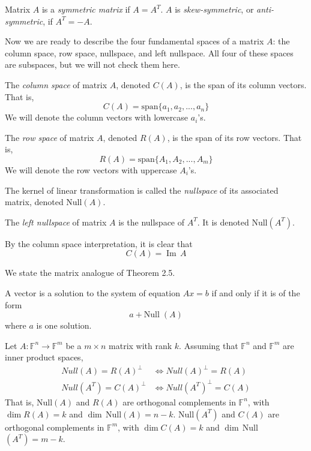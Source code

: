 \documentclass{article}
\DeclareMathOperator{\im}{Im}
\begin{document}
    \begin{definition}
    Matrix $A$ is a \textit{symmetric matrix} if $A = A^T$. $A$ is \textit{skew-symmetric}, or \textit{anti-symmetric}, if $A^T = - A$. 
    \end{definition}

    Now we are ready to describe the four fundamental spaces of a matrix $A$: the column space, row space, nullspace, and left nullspace. All four of these spaces are subspaces, but we will not check them here. 

    \begin{definition}
    The \textit{column space} of matrix $A$, denoted $C(A)$, is the span of its column vectors. That is, 
    \[C(A) = \text{span}\{ a_1, a_2, ..., a_n\}\]
    We will denote the column vectors with lowercase $a_i$'s.
    \end{definition}

    \begin{definition}
    The \textit{row space} of matrix $A$, denoted $R(A)$, is the span of its row vectors. That is, 
    \[R(A) = \text{span}\{ A_1, A_2, ..., A_m\}\]
    We will denote the row vectors with uppercase $A_i$'s. 
    \end{definition}

    \begin{definition}
    The kernel of linear transformation is called the \textit{nullspace} of its associated matrix, denoted Null$(A)$. 
    \end{definition}

    \begin{definition}
    The \textit{left nullspace} of matrix $A$ is the nullspace of $A^T$. It is denoted Null$(A^T)$. 
    \end{definition}

    \begin{proposition}
    By the column space interpretation, it is clear that
    \[C(A) = \im \, A\]
    \end{proposition}

    We state the matrix analogue of Theorem 2.5. 
    \begin{theorem}
    A vector is a solution to the system of equation $A x = b$ if and only if it is of the form 
    \[ a + \text{Null}\; (A)\]
    where $a$ is one solution. 
    \end{theorem}

    \begin{theorem}
    Let $A: \mathbb{F}^n \longrightarrow \mathbb{F}^m$ be a $m \times n$ matrix with rank $k$. Assuming that $\mathbb{F}^n$ and $\mathbb{F}^m$ are inner product spaces,  
    \begin{align}
        Null(A) = R(A)^\perp &\iff Null(A)^\perp = R(A) \\
        Null(A^T) = C(A)^\perp &\iff Null(A^T)^\perp = C(A)
    \end{align}
    That is, Null$(A)$ and $R(A)$ are orthogonal complements in $\mathbb{F}^n$, with $\dim R(A) = k$ and $\dim\,$Null$(A) = n - k$. Null$(A^T)$ and $C(A)$ are orthogonal complements in $\mathbb{F}^m$, with $\dim C(A) = k$ and $\dim \,$Null$(A^T) = m - k$. 
    \end{theorem}
\end{document}
